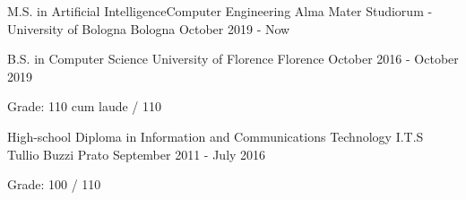 
\begin{cventries}

  \cventry
    {M.S. in Artificial Intelligence{\enskip\cdotp\enskip}Computer Engineering}
    {Alma Mater Studiorum - University of Bologna}
    {Bologna}
    {October 2019 - Now}
    {}
    \vspace{-4.0mm}

  \cventry
    {B.S. in Computer Science}
    {University of Florence}
    {Florence}
    {October 2016 - October 2019}
    {
      \begin{cvitems}
        \item {Grade: 110 cum laude / 110}
      \end{cvitems}
    }

  \cventry
    {High-school Diploma in Information and Communications Technology}
    {I.T.S Tullio Buzzi}
    {Prato}
    {September 2011 - July 2016}
    {
      \begin{cvitems}
        \item {Grade: 100 / 110}
      \end{cvitems}
    }

\end{cventries}
